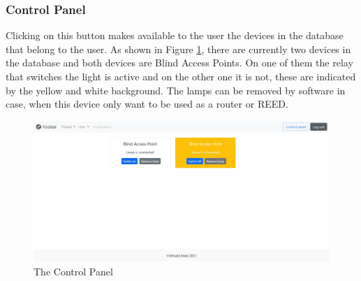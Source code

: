 \subsubsection{Control Panel}
Clicking on this button makes available to the user the devices in the database that belong to the user. As shown in Figure \ref{fig:controlpanel}, there are currently two devices in the database and both devices are Blind Access Points. On one of them the relay that switches the light is active and on the other one it is not, these are indicated by the yellow and white background. The lamps can be removed by software in case, when this device only want to be used as a router or REED.
\begin{figure}
    \centering
    \includegraphics[width=\textwidth]{img/controlpanel.jpeg}
    \caption{The Control Panel}
    \label{fig:controlpanel}
\end{figure}


